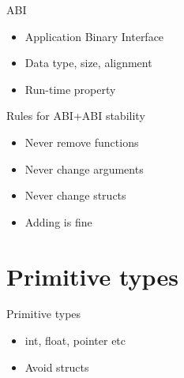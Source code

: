 \documentclass[pdf]{beamer}
\begin{document}
\begin{frame}

        \begin{block}{ABI}
        \pause
        \begin{itemize}[<+>]
            \item Application Binary Interface
            \item Data type, size, alignment
            \item Run-time property
        \end{itemize}
    \end{block}

\end{frame}

\begin{frame}
    \begin{block}{Rules for ABI+ABI stability}
    \pause
        \begin{itemize}[<+>]
            \item Never remove functions
            \item Never change arguments
            \item Never change structs
            \item Adding is fine
        \end{itemize}
    \end{block}

\end{frame}

\section{Primitive types}
\begin{frame}
    \begin{block}{Primitive types}
        \begin{itemize}
            \item int, float, pointer etc
            \item Avoid structs
        \end{itemize}
    \end{block}

\end{frame}
\end{document}
